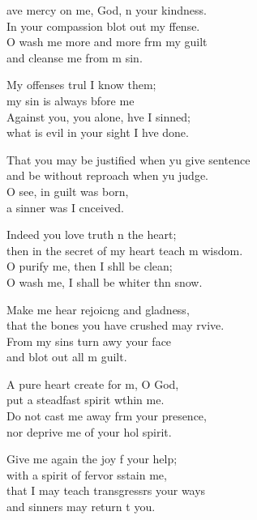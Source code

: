 \begin{psalmverse}
  \begin{patverse}
ave mercy on me, God, \pointup{\i}n your kindness.\Med\\
In your compassion blot out my ffense.\\
O wash me more and more frm my guilt\Med\\
and cleanse me from m sin.

My offenses trul I know them;\Med\\
my sin is always bfore me\\
Against you, you alone, hve I sinned;\Med\\
what is evil in your sight I hve done.

That you may be justified when yu give sentence\Med\\
and be without reproach when yu judge.\\
O see, in guilt \pointup{\i} was born,\Med\\
a sinner was I cnceived.

Indeed you love truth \pointup{\i}n the heart;\Med\\
then in the secret of my heart teach m wisdom.\\
O purify me, then I shll be clean;\Med\\
O wash me, I shall be whiter thn snow.

Make me hear rejoic\pointup{\i}ng and gladness,\Med\\
that the bones you have crushed may rvive.\\
From my sins turn awy your face\Med\\
and blot out all m guilt.

A pure heart create for m, O God,\Med\\
put a steadfast spirit w\pointup{\i}thin me.\\
Do not cast me away frm your presence,\Med\\
nor deprive me of your hol spirit.

Give me again the joy f your help;\Med\\
with a spirit of fervor sstain me,\\
that I may teach transgressrs your ways\Med\\
and sinners may return t you.


\end{patverse}
\end{psalmverse}
